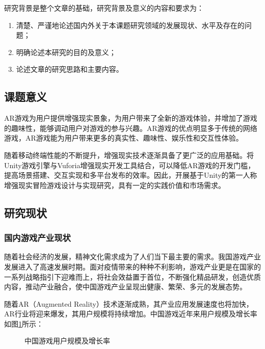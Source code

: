 \documentclass[12pt]{graduate-design-manual}
\begin{document}
研究背景是整个文章的基础，研究背景及意义的内容和要求为：
\begin{enumerate}
    \item 清楚、严谨地论述国内外关于本课题研究领域的发展现状、水平及存在的问题；
    \item 明确论述本研究的目的及意义；
    \item 论述文章的研究思路和主要内容。
\end{enumerate}

\subsection{课题意义}
AR游戏为用户提供增强现实景象，为用户带来了全新的游戏体验，并增加了游戏的趣味性，能够调动用户对游戏的参与兴趣\cite{wang2019unity3d}。AR游戏的优点明显多于传统的网络游戏，AR游戏能为用户带来更多的真实性、趣味性、娱乐性和交互性体验。

随着移动终端性能的不断提升，增强现实技术逐渐具备了更广泛的应用基础。将Unity游戏引擎与Vuforia增强现实开发工具结合，可以降低AR游戏的开发门槛，提高场景搭建、交互实现和多平台发布的效率。因此，开展基于Unity的第一人称增强现实冒险游戏设计与实现研究，具有一定的实践价值和市场需求。

\subsection{研究现状}
\subsubsection{国内游戏产业现状}
随着社会经济的发展，精神文化需求成为了人们当下最主要的需求。我国游戏产业发展进入了高速发展时期。面对疫情带来的种种不利影响，游戏产业更是在国家的一系列战略指引下迎难而上，将社会效益置于首位，不断强化精品研发，创造优质内容，推动产业融合，使中国游戏产业呈现出健康、繁荣、多元的发展态势。

随着AR（Augmented Reality）技术逐渐成熟，其产业应用发展速度也将加快，AR行业将迎来爆发，其用户规模将持续增加\cite{guo2019ar}。中国游戏近年来用户规模及增长率如图\ref{fig:china-game-users}所示：

\begin{figure}[H]
    \centering
    \caption{中国游戏用户规模及增长率}
    \label{fig:china-game-users}
\end{figure}
\end{document}
